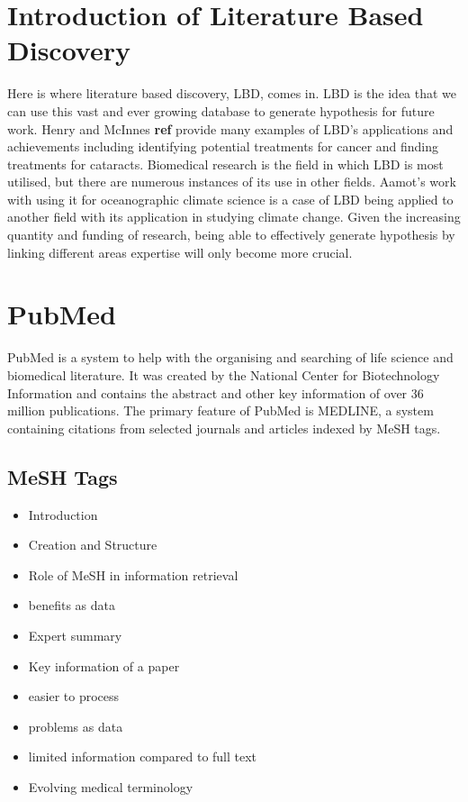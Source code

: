 \documentclass{l4proj}
\begin{document}
\section{Introduction of Literature Based Discovery}

Here is where literature based discovery, LBD, comes in. LBD is the idea that we can use this vast and ever growing database to generate hypothesis for future work. Henry and McInnes \textbf{ref} provide many examples of LBD's applications and achievements including identifying potential treatments for cancer and finding treatments for cataracts. Biomedical research is the field in which LBD is most utilised, but there are numerous instances of its use in other fields. Aamot's work with using it for oceanographic climate science is a case of LBD being applied to another field with its application in studying climate change. Given the increasing quantity and funding of research, being able to effectively generate hypothesis by linking different areas expertise will only become more crucial.\\  

\section{PubMed}

PubMed is a system to help with the organising and searching of life science and biomedical literature. It was created by the National Center for Biotechnology Information and contains the abstract and other key information of over 36 million publications. The primary feature of PubMed is MEDLINE, a system containing citations from selected journals and articles indexed by MeSH tags. \\

\subsection{MeSH Tags}
\begin{itemize}
    \item Introduction
    \item Creation and Structure
    \item Role of MeSH in information retrieval 
    \item benefits as data 
    \item Expert summary
    \item Key information of a paper
    \item easier to process
    \item problems as data
    \item limited information compared to full text
    \item Evolving medical terminology
\end{itemize}
\end{document}
